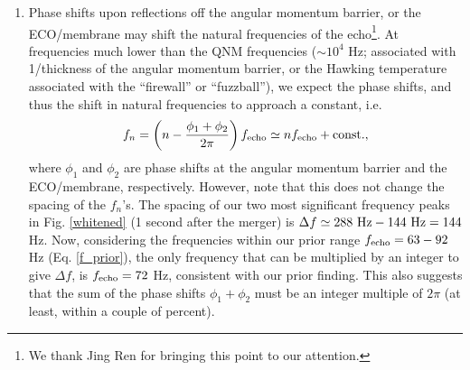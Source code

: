 \documentclass[a4paper,11pt]{article}
\begin{document}
\begin{enumerate}
\item Phase shifts upon reflections off the angular momentum barrier, or the ECO/membrane may shift the natural frequencies of the echo\footnote{We thank Jing Ren for bringing this point to our attention.}. At frequencies much lower than the QNM frequencies ($\sim 10^4$ Hz; associated with 1/thickness of the angular momentum barrier, or the Hawking temperature associated with the ``firewall'' or ``fuzzball''), we expect the phase shifts, and thus the shift in natural frequencies to approach a constant, i.e. 
\begin{equation}
f_{n} = \left(n- \frac{\phi_1+\phi_2}{2\pi}\right)f_{\rm echo} \simeq n f_{\rm echo} + {\rm const.},   
\end{equation}
where $\phi_1$ and $\phi_2$ are phase shifts at the angular momentum barrier and the ECO/membrane, respectively. However, note that this does not change the spacing of the $f_n$'s. The spacing of our two most significant frequency peaks in Fig. \ref{whitened} (1 second after the merger) is $\Delta f \simeq 288 ~{\rm Hz} - 144~ {\rm Hz} = 144$ Hz. Now, considering the frequencies within our prior range $f_{\rm echo} =63-92$ Hz (Eq. \ref{f_prior}), the only frequency that can be multiplied by an integer to give $\Delta f$, is $f_{\rm echo} = 72$ Hz, consistent with our prior finding. This also suggests that the sum of the phase shifts $\phi_1+\phi_2$ must be an integer multiple of $2\pi$ (at least, within a couple of percent).  


\end{enumerate}
\end{document}
